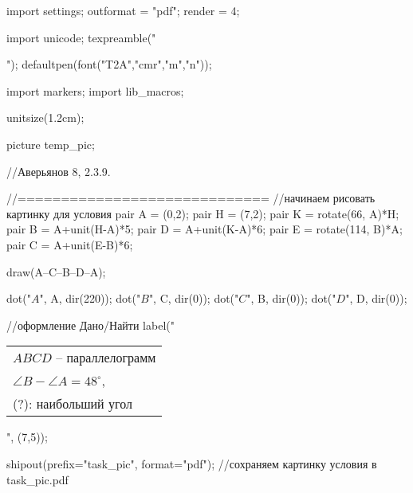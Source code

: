 import settings; 
outformat = "pdf";
render = 4;

import unicode;
texpreamble("\usepackage{xcolor}\usepackage{amsmath}\usepackage[russian]{babel}");
defaultpen(font("T2A","cmr","m","n"));

import markers;
import lib_macros;

unitsize(1.2cm);

picture temp_pic;

//Аверьянов 8, 2.3.9.

//=============================
//начинаем рисовать картинку для условия
pair A = (0,2);
pair H = (7,2);
pair K = rotate(66,  A)*H;
pair B = A+unit(H-A)*5;
pair D = A+unit(K-A)*6;
pair E = rotate(114,  B)*A;
pair C = A+unit(E-B)*6;

draw(A--C--B--D--A);



dot("$A$", A, dir(220));
dot("$B$", C, dir(0));
dot("$C$", B, dir(0));
dot("$D$", D, dir(0));




//оформление Дано/Найти
label("\begin{tabular}{l}
$ABCD$ -- параллелограмм\\
$\angle B-\angle A = 48^{\circ}$,\\
(?): наибольший угол
\end{tabular}", (7,5));

shipout(prefix="task_pic", format="pdf"); //сохраняем картинку условия в task_pic.pdf
